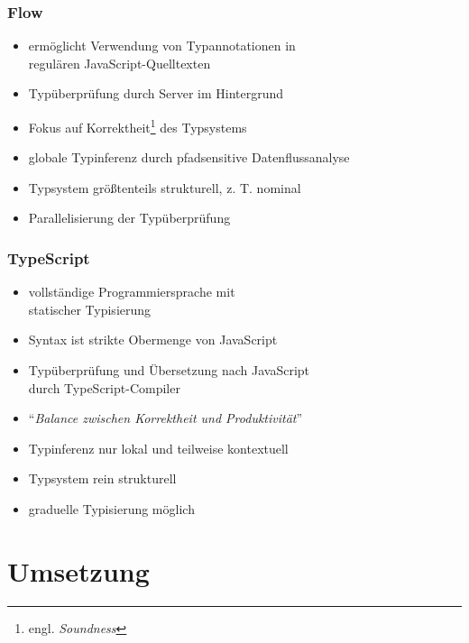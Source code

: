     \begin{frame}
      \frametitle{Flow}
      \begin{itemize}
        \item ermöglicht Verwendung von Typannotationen in\\ regulären JavaScript-Quelltexten
        \item Typüberprüfung durch Server im Hintergrund
        \item Fokus auf Korrektheit\footnote{engl. \textit{Soundness}} des Typsystems
        \item globale Typinferenz durch pfadsensitive Datenflussanalyse
        \item Typsystem größtenteils strukturell, z. T. nominal
        \item Parallelisierung der Typüberprüfung
      \end{itemize}
    \end{frame}

    \begin{frame}
      \frametitle{TypeScript}
      \begin{itemize}
        \item vollständige Programmiersprache mit\\statischer Typisierung
        \item Syntax ist strikte Obermenge von JavaScript
        \item Typüberprüfung und Übersetzung nach JavaScript\\durch TypeScript-Compiler
        \item \enquote{\textit{Balance zwischen Korrektheit und Produktivität}}~\autocite{TYPESCRIPT:DESIGN_GOALS}
        \item Typinferenz nur lokal und teilweise kontextuell
        \item Typsystem rein strukturell
        \item graduelle Typisierung möglich
      \end{itemize}
    \end{frame}

  \section{Umsetzung}

